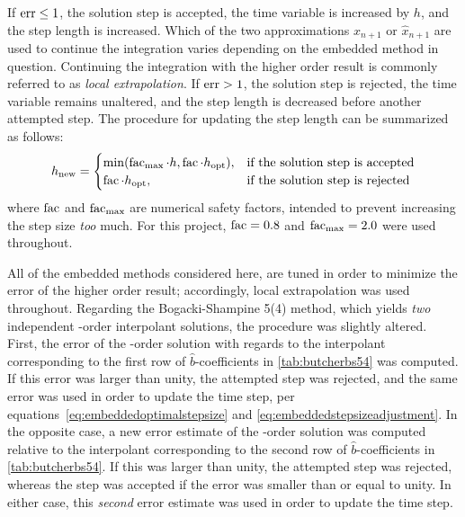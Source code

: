 If $\operatorname{err}\leq1$, the solution step is accepted, the time variable is increased
by $h$, and the step length is increased. Which of the two approximations
$x_{n+1}$ or $\widehat{x}_{n+1}$ are used to continue the integration varies
depending on the embedded method in question. Continuing the integration with
the higher order result is commonly referred to as \emph{local extrapolation}.
If $\operatorname{err}>1$, the solution step is rejected, the time variable remains
unaltered, and the step length is decreased before another attempted step. The
procedure for updating the step length can be summarized as follows:
\begin{equation}
    \label{eq:embeddedstepsizeadjustment}
h_{\mathrm{new}}=\begin{cases}%
    \min(\facem_{\mathrm{max}}\cdot{}h,\facem\cdot{}h_{\mathrm{opt}}),&
\textnormal{if the solution step is accepted}\\
\facem\cdot{}h_{\mathrm{opt}},&\textnormal{if the solution step is rejected}%
\end{cases}
\end{equation}
where $\operatorname{fac}$ and $\operatorname{fac}_{\mathrm{max}}$ are numerical safety factors,
intended to prevent increasing the step size \emph{too} much. For this project,
$\operatorname{fac}=0.8$ and $\operatorname{fac}_{\mathrm{max}}=2.0$ were used throughout.

All of the embedded methods considered here, are tuned in order to minimize
the error of the higher order result; accordingly, local extrapolation was
used throughout. Regarding the Bogacki-Shampine 5(4) method, which yields
\emph{two} independent -order interpolant solutions, the procedure was
slightly altered. First, the error of the -order solution with regards to
the interpolant corresponding to the first row of $\widehat{b}$-coefficients in
\cref{tab:butcherbs54} was computed. If this error was larger than unity,
the attempted step was rejected, and the same error was used in order to
update the time step, per equations~\eqref{eq:embeddedoptimalstepsize} and
\eqref{eq:embeddedstepsizeadjustment}. In the opposite case, a new error
estimate of the -order solution was computed relative to the
interpolant corresponding to the second row of $\widehat{b}$-coefficients in
\cref{tab:butcherbs54}. If this was larger than unity, the attempted step
was rejected, whereas the step was accepted if the error was smaller than or
equal to unity. In either case, this \emph{second} error estimate was used
in order to update the time step.
